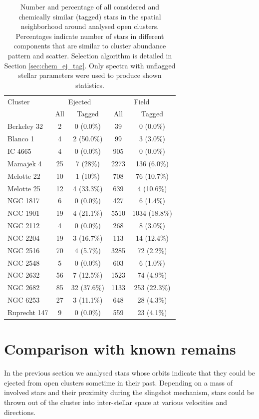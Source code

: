 \begin{table}
	\centering
	\caption{Number and percentage of all considered and chemically similar (tagged) stars in the spatial neighborhood around analysed open clusters. Percentages indicate number of stars in different components that are similar to cluster abundance pattern and scatter. Selection algorithm is detailed in Section \ref{sec:chem_ej_tag}. Only spectra with unflagged stellar parameters were used to produce shown statistics.}
	\begin{tabular}{l | c | c | c | c }
		\hline
		Cluster & \multicolumn{2}{c}{Ejected}  & \multicolumn{2}{c}{Field} \\
		 & All & Tagged & All & Tagged \\
		\hline
		Berkeley 32  & 2 & 0 (0.0\%) & 39 & 0 (0.0\%) \\ 
		Blanco 1     & 4 & 2 (50.0\%) & 99 & 3 (3.0\%) \\
		IC 4665      & 4 & 0 (0.0\%) & 905 & 0 (0.0\%) \\
		Mamajek 4    & 25 & 7 (28\%) & 2273 & 136 (6.0\%) \\
		Melotte 22   & 10 & 1 (10\%) & 708 & 76 (10.7\%) \\
		Melotte 25   & 12 & 4 (33.3\%) & 639 & 4 (10.6\%) \\
		NGC 1817     & 6 & 0 (0.0\%) & 427 & 6 (1.4\%) \\
		NGC 1901     & 19 & 4 (21.1\%) & 5510 & 1034 (18.8\%) \\
		NGC 2112     & 4 & 0 (0.0\%) & 268 & 8 (3.0\%) \\
		NGC 2204     & 19 & 3 (16.7\%) & 113 & 14 (12.4\%) \\
		NGC 2516     & 70 & 4 (5.7\%) & 3285 & 72 (2.2\%) \\
		NGC 2548     & 5 & 0 (0.0\%) & 603 & 6 (1.0\%) \\
		NGC 2632     & 56 & 7 (12.5\%) & 1523 & 74 (4.9\%) \\
		NGC 2682     & 85 & 32 (37.6\%) & 1133 & 253 (22.3\%) \\
		NGC 6253     & 27 & 3 (11.1\%) & 648 & 28 (4.3\%) \\
		Ruprecht 147 & 9 & 0 (0.0\%) & 559 & 23 (4.1\%) \\
		\hline
	\end{tabular}
	\label{tab:cluster_stats_abundtag}
\end{table}

\section{Comparison with known remains}
\label{sec:tails_chem}
In the previous section we analysed stars whose orbits indicate that they could be ejected from open clusters sometime in their past. Depending on a mass of involved stars and their proximity during the slingshot mechanism, stars could be thrown out of the cluster into inter-stellar space at various velocities and directions. 

